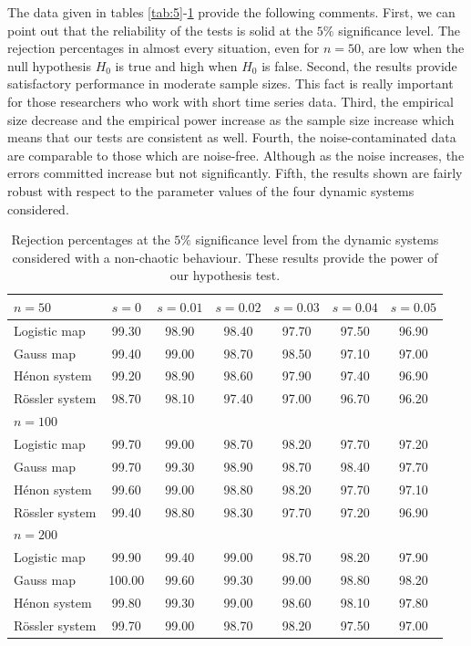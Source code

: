 The data given in tables \ref{tab:5}-\ref{tab:6} provide the following comments. First, we can point out that the reliability of the tests is solid at the $5\%$ significance level. The rejection percentages in almost every situation, even for $n=50$, are low when the null hypothesis ${H_0}$ is true and high when ${H_0}$ is false. Second, the results provide satisfactory performance in moderate sample sizes. This fact is really important for those researchers who work with short time series data. Third, the empirical size decrease and the empirical power increase as the sample size increase which means that our tests are consistent as well. Fourth, the noise-contaminated data are comparable to those which are noise-free. Although as the noise increases, the errors committed increase but not significantly. Fifth, the results shown are fairly robust with respect to the parameter values of the four dynamic systems considered. 

\begin{table}[ht!]
\centering
\begin{adjustbox}{width=\textwidth}
\begin{tabular}{l|cccccc}
\hline 
$n=50$ &  $s=0$      & $s=0.01$  & $s=0.02$  & $s=0.03$      & $s=0.04$  & $s=0.05$  \\ \hline
Logistic map        & 99.30 & 98.90 & 98.40 & 97.70 & 97.50 & 96.90 \\ 
Gauss map          & 99.40 & 99.00 & 98.70 & 98.50 & 97.10 & 97.00\\ 
H\'enon  system      & 99.20 & 98.90 & 98.60 & 97.90 & 97.40 & 96.90\\ 
R\"ossler  system        & 98.70 & 98.10 & 97.40 & 97.00 & 96.70 & 96.20\\ \hline
$n=100$ &        &   &   &       &   &   \\ \hline
Logistic map        & 99.70 & 99.00 & 98.70 & 98.20 & 97.70 & 97.20\\ 
Gauss map          & 99.70 & 99.30 & 98.90 & 98.70 & 98.40 & 97.70\\ 
H\'enon  system      & 99.60 & 99.00 & 98.80 & 98.20 & 97.70 & 97.10\\
R\"ossler  system        & 99.40 & 98.80 & 98.30 & 97.70 & 97.20 & 96.90\\ \hline
$n=200$ &        &   &   &       &   &   \\ \hline
Logistic map        & 99.90 & 99.40 & 99.00 & 98.70 & 98.20 & 97.90\\ 
Gauss map           & 100.00 & 99.60 & 99.30 & 99.00 & 98.80 & 98.20\\ 
H\'enon  system      & 99.80 & 99.30 & 99.00 & 98.60 & 98.10 & 97.80\\ 
R\"ossler  system        & 99.70 & 99.00 & 98.70 & 98.20 & 97.50 & 97.00\\ \hline
\end{tabular}
\end{adjustbox}
\caption{\label{tab:6} Rejection percentages at the $5\%$ significance level from the dynamic systems considered with a non-chaotic behaviour. These results provide the power of our hypothesis test.} 
\end{table}

